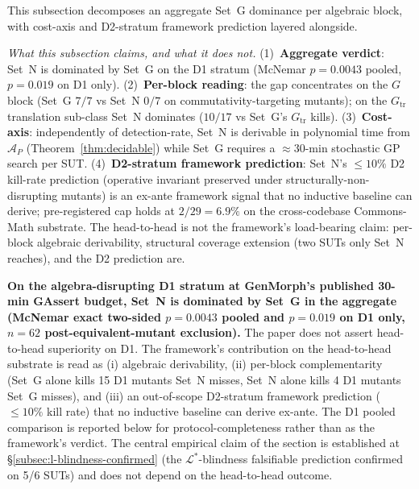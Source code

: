 \documentclass[manuscript]{acmart}
\begin{document}
This subsection decomposes an aggregate Set~G dominance per algebraic block, with cost-axis and D2-stratum framework prediction layered alongside.

\begin{tcolorbox}[breakable,colback=gray!5,colframe=black!50,arc=2pt,boxrule=0.5pt,fontupper=\small,title=Scope of the head-to-head comparison,fonttitle=\small\bfseries]
\textit{What this subsection claims, and what it does not.} (1)~\textbf{Aggregate verdict}: Set~N is dominated by Set~G on the D1 stratum (McNemar $p = 0.0043$ pooled, $p = 0.019$ on D1 only). (2)~\textbf{Per-block reading}: the gap concentrates on the $G$ block (Set~G $7/7$ vs Set~N $0/7$ on commutativity-targeting mutants); on the $G_{\mathrm{tr}}$ translation sub-class Set~N dominates ($10/17$ vs Set~G's $G_{\mathrm{tr}}$ kills). (3)~\textbf{Cost-axis}: independently of detection-rate, Set~N is derivable in polynomial time from $\mathcal{A}_P$ (Theorem~\ref{thm:decidable}) while Set~G requires a $\approx 30$-min stochastic GP search per SUT. (4)~\textbf{D2-stratum framework prediction}: Set~N's $\le 10\%$ D2 kill-rate prediction (operative invariant preserved under structurally-non-disrupting mutants) is an ex-ante framework signal that no inductive baseline can derive; pre-registered cap holds at $2/29 = 6.9\%$ on the cross-codebase Commons-Math substrate. The head-to-head is not the framework's load-bearing claim: per-block algebraic derivability, structural coverage extension (two SUTs only Set~N reaches), and the D2 prediction are.
\end{tcolorbox}

\textbf{On the algebra-disrupting D1 stratum at GenMorph's published
30-min GAssert budget, Set~N is dominated by Set~G in the aggregate
(McNemar exact two-sided $p = 0.0043$ pooled and $p = 0.019$ on D1
only, $n = 62$ post-equivalent-mutant exclusion).} The paper does not
assert head-to-head superiority on D1. The framework's contribution
on the head-to-head substrate is read as (i) algebraic derivability,
(ii) per-block complementarity (Set~G alone kills 15 D1 mutants
Set~N misses, Set~N alone kills 4 D1 mutants Set~G misses), and
(iii) an out-of-scope D2-stratum framework prediction
($\le 10\%$ kill rate) that no inductive baseline can derive
ex-ante. The D1 pooled comparison is reported below for
protocol-completeness rather than as the framework's verdict. The
central empirical claim of the section is established at
\S\ref{subsec:l-blindness-confirmed} (the $\mathcal{L}^{*}$-blindness
falsifiable prediction confirmed on 5/6 SUTs) and does not depend on
the head-to-head outcome.
\end{document}
